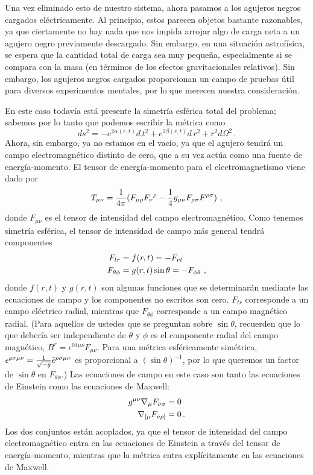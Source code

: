 \documentclass[11pt,b5paper,openany,twoside]{book}
\newcommand{\mn}{{\mu\nu}}
\def\g{{\sqrt{-g}}}
\begin{document}
Una vez eliminado esto de nuestro sistema, ahora pasamos a los agujeros negros cargados eléctricamente.
Al principio, estos parecen objetos bastante razonables, ya que ciertamente no hay nada que nos impida arrojar algo de carga neta a un agujero negro previamente descargado.
Sin embargo, en una situación astrofísica, se espera que la cantidad total de carga sea muy pequeña, especialmente si se compara con la masa (en términos de los efectos gravitacionales relativos).
Sin embargo, los agujeros negros cargados proporcionan un campo de pruebas útil para diversos experimentos mentales, por lo que merecen nuestra consideración.

En este caso todavía está presente la simetría esférica total del problema; sabemos por lo tanto que podemos escribir la métrica como
\begin{equation}
ds^2 = -e^{2\alpha(r,t)} d\,t^2 + e^{2\beta(r,t)} d\,r^2 +
r^2 d\Omega^2\,.\label{7.106}
\end{equation}
Ahora, sin embargo, ya no estamos en el vacío, ya que el agujero tendrá un campo electromagnético distinto de cero, que a su vez actúa como una fuente de energía-momento.
El tensor de energía-momento para el electromagnetismo viene dado por
\begin{equation}
T_\mn = {1\over{4\pi}}(F_{\mu\rho}F_\nu{}^\rho
-{1\over 4}g_\mn F_{\rho\sigma}F^{\rho\sigma})\ ,\label{7.107}
\end{equation}
donde $F_\mn$ es el tensor de intensidad del campo electromagnético.
Como tenemos simetría esférica, el tensor de intensidad de campo más general tendrá componentes
\begin{align}
F_{tr}  &=  f(r,t) = -F_{rt} \notag \\
F_{\theta\phi}  &=  g(r,t)\sin\theta = -F_{\phi\theta}\ ,
\label{7.108}
\end{align}
donde $f(r,t)$ y $g(r,t)$ son algunas funciones que se determinarán mediante las ecuaciones de campo y los componentes no escritos son cero.
$F_{tr}$ corresponde a un campo eléctrico radial, mientras que $F_{\theta\phi}$ corresponde a un campo magnético radial.
(Para aquellos de ustedes que se preguntan sobre $\sin\theta$, recuerden que lo que debería ser independiente de $\theta$ y $\phi$ es el componente radial del campo magnético, $B^r = \epsilon^{01\mu\nu}F_{\mu\nu}$.
Para una métrica esféricamente simétrica, $\epsilon^{\rho\sigma\mu\nu}={1\over\g}\tilde\epsilon^{\rho\sigma\mu\nu}$ es proporcional a $(\sin\theta)^{-1}$, por lo que queremos un factor de $\sin\theta$ en $F_{\theta\phi}$.)
Las ecuaciones de campo en este caso son tanto las ecuaciones de Einstein como las ecuaciones de Maxwell:
\begin{align}
g^\mn \nabla_\mu F_{\nu\sigma}  &=  0 \notag \\
\nabla_{[\mu}F_{\nu\rho]}  &=  0\,.\label{7.109}
\end{align}
Los dos conjuntos están acoplados, ya que el tensor de intensidad del campo electromagnético entra en las ecuaciones de Einstein a través del tensor de energía-momento, mientras que la métrica entra explícitamente en las ecuaciones de Maxwell.
\end{document}
